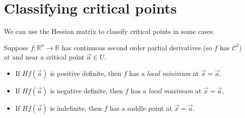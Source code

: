 \documentclass{ximera}
\begin{document}
\section*{Classifying critical points}

We can use the Hessian matrix to classify critical points in some cases.

\begin{proposition}
Suppose $f:\mathbb{R}^n\rightarrow\mathbb{R}$ has continuous second order partial derivatives (so $f$ has $\mathcal{C}^2$) at and near a critical point $\vec{a}\in U$.
\begin{itemize}
\item If $Hf(\vec{a})$ is positive definite, then $f$ has a \emph{local minimum} at $\vec{x}=\vec{a}$.
\item If $Hf(\vec{a})$ is negative definite, then $f$ has a \emph{local maximum} at $\vec{x}=\vec{a}$.
\item If $Hf(\vec{a})$ is indefinite, then $f$ has a saddle point at $\vec{x}=\vec{a}$.
\end{itemize}
\end{proposition}
\end{document}
